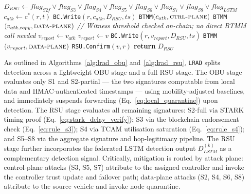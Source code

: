 \documentclass[12pt, a4paper]{report}
\begin{document}
\begin{algorithm}[H]
\begin{algorithmic}[1]
  \State $D_{RSU} \gets flag_{S2f}\lor flag_{S3}
         \lor flag_{S4}\lor flag_{S5}\lor flag_{S6}
         \lor flag_{S7}\lor flag_{S8}\lor flag_{LSTM}$
      \State $c_{atk} \gets c^*(r,t)$
             \hfill{}
      \State \texttt{BC.Write}$(r,c_{atk},D_{RSU},ts)$
      \State \texttt{BTMM}$(c_{atk},
             \textsc{ctrl-plane})$
             \hfill{}
        \State \texttt{BTMM}$(v_{atk,copy},
               \textsc{data-plane})$
               \hfill{}
      \EndIf
        \State \textit{// Witness threshold checked
               on-chain; no direct BTMM call needed}
      \EndIf
    \Else
      \hfill{}
        \State $v_{report} \gets v_{atk}$
      \Else
        \State $v_{report} \gets v$
      \EndIf
      \State \texttt{BC.Write}$(r,v_{report},
             D_{RSU},ts)$
      \State \texttt{BTMM}$(v_{report},
             \textsc{data-plane})$
    \EndIf
    \State \texttt{RSU.Confirm}$(v,r)$
           \hfill{}
  \EndIf
  \State \textbf{return} $D_{RSU}$
\EndProcedure
\end{algorithmic}
\label{alg:lrad_rsu}
\end{algorithm}


As outlined in Algorithms~\ref{alg:lrad_obu}
and~\ref{alg:lrad_rsu}, \texttt{LRAD} splits
detection across a lightweight \ac{OBU} stage and a
full \ac{RSU} stage. The \ac{OBU} stage evaluates
only S1 and S2-partial --- the two signatures
computable from local data and \ac{HMAC}-authenticated
timestamps --- using mobility-adjusted baselines, and
immediately suspends forwarding (Eq.~\ref{eq:local_quarantine})
upon detection. The \ac{RSU} stage evaluates all remaining signatures:
S2-full via \ac{STARK} timing proof
(Eq.~\ref{eq:stark_delay_verify}); S3 via the
blockchain endorsement check
(Eq.~\ref{eq:rule_s3}); S4 via \ac{TCAM}
utilisation saturation (Eq.~\ref{eq:rule_s4}); and
S5--S8 via the aggregate signature and hop-legitimacy
pipeline. The \ac{RSU} stage further incorporates the
federated \ac{LSTM} detection output $D_{LSTM}^{(k)}$
as a complementary detection signal. Critically,
mitigation is routed by attack plane: control-plane
attacks (S3, S5, S7) attribute to the assigned
controller and invoke the controller trust update and
failover path; data-plane attacks (S2, S4, S6, S8)
attribute to the source vehicle and invoke node
quarantine.
\end{document}
